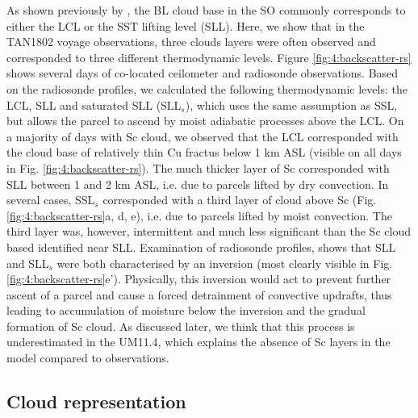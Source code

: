 As shown previously by \cite{kuma2020a}, the BL cloud base in the SO commonly
corresponds to either the LCL or the SST lifting level (SLL). Here, we show
that in the TAN1802 voyage observations, three clouds layers were often observed
and corresponded to three different thermodynamic levels. Figure
\ref{fig:4:backscatter-rs} shows several days of co-located ceilometer and
radiosonde observations. Based on the radiosonde profiles, we calculated the
following thermodynamic levels: the LCL, SLL and saturated SLL (SLL$_s$), which
uses the same assumption as SSL, but allows the parcel to ascend by moist
adiabatic processes above the LCL. On a majority of days with Sc cloud, we observed
that the LCL corresponded with the cloud base of relatively thin Cu fractus
below 1 km ASL (visible on all days in Fig. \ref{fig:4:backscatter-rs}). The much thicker
layer of Sc corresponded with SLL between 1 and 2 km ASL, i.e. due to parcels lifted by dry convection.
In several cases, SSL$_s$ corresponded with a third layer of cloud above Sc
(Fig. \ref{fig:4:backscatter-rs}a, d, e), i.e. due to parcels lifted by moist
convection. The third layer was, however, intermittent and much less significant
than the Sc cloud based identified near SLL. Examination of radiosonde profiles, shows that SLL and SLL$_s$ were both characterised by an inversion (most clearly visible in Fig.
\ref{fig:4:backscatter-rs}e'). Physically, this inversion would act to prevent
further ascent of a parcel and cause a forced detrainment of convective updrafts,
thus leading to accumulation of moisture below the inversion and the gradual
formation of Sc cloud. As discussed later, we think that this process is
underestimated in the UM11.4, which explains the absence of Sc layers in the model compared to observations.

\subsection{Cloud representation}
\label{sec:4:cloud-representation}

